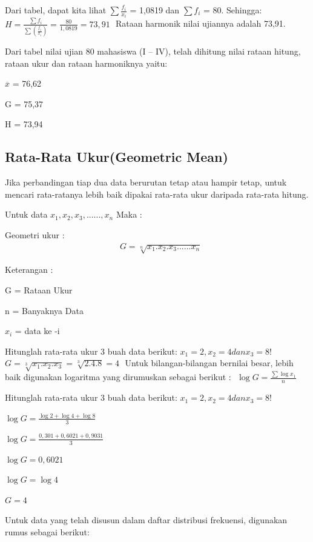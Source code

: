 \documentclass[11pt,fleqn]{book} %
\begin{document}
{Dari tabel, dapat kita lihat $\sum \frac{f_{i}}{x_{i}}$  = 1,0819 dan $\sum f_{i}$  = 80. Sehingga:
$ $
$ H = \frac{\sum f_{i}}{\sum (\frac{f_{i}}{x_{i}})} = \frac{80}{1,0819} = 73,91 $
$ $
Rataan harmonik nilai ujiannya adalah 73,91.

Dari tabel nilai ujian 80 mahasiswa (I – IV), telah dihitung nilai rataan hitung, rataan ukur dan rataan harmoniknya yaitu:

$\overline{x}$ = 76,62

G = 75,37

H = 73,94


\subsection{Rata-Rata Ukur(Geometric Mean)}

Jika perbandingan tiap dua data berurutan tetap atau hampir tetap, untuk mencari rata-ratanya lebih baik dipakai rata-rata ukur daripada rata-rata hitung.

Untuk data $ x_{1},x_{2},x_{3},......,x_{n} $ Maka :

\begin{theorem}[Mean]
Geometri ukur :
\begin{align}
& G = \sqrt[n]{x_{1}.x_{2}.x_{3}......x_{n}} 
\end{align}
\end{theorem}


Keterangan :

G = Rataan Ukur

n = Banyaknya Data

$ x_{i} $ = data ke -i

Hitunglah rata-rata ukur 3 buah data berikut: $x_{1} = 2, x_{2} = 4 dan x_{3} = 8! $ 
$ 
$
$ G= \sqrt[3]{x_{1}.x_{2}.x_{3}} = \sqrt[3]{2.4.8} = 4 $
$ 
$
Untuk bilangan-bilangan bernilai besar, lebih baik digunakan logaritma yang dirumuskan sebagai berikut :
$ 
$
$\log G = \frac{\sum\log x_{1}}{n}$
$ 
$

Hitunglah rata-rata ukur 3 buah data berikut: $x_{1} = 2, x_{2} = 4 dan x_{3} = 8! $

$\log G = \frac{\log 2 + \log 4 + \log 8}{3} $

$\log G = \frac{0,301+0,6021+0,9031}{3}$

$\log G = 0,6021$

$\log G = \log 4 $

$G = 4 $

Untuk data yang telah disusun dalam daftar distribusi frekuensi, digunakan rumus sebagai berikut:

}
\end{document}
